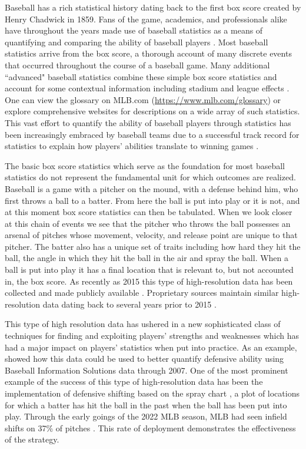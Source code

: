 \documentclass[12pt]{article}
\begin{document}
Baseball has a rich statistical history dating back to the first box score created by Henry Chadwick in 1859. Fans of the game, academics, and professionals alike have throughout the years made use of baseball statistics as a means of quantifying and comparing the ability of baseball players \citep{berry1999bridging, schwarz2004numbers, albert2006pitching, brown2008season, jensen2009hierarchical, jensen2009bayesball, piette2012estimating, baumer2015openwar, marchi2019analyzing}. Most baseball statistics arrive from the box score, a thorough account of many discrete events that occurred throughout the course of a baseball game. Many additional ``advanced" baseball statistics combine these simple box score statistics and account for some contextual information including stadium and league effects \citep{marchi2019analyzing}. One can view the glossary on MLB.com (\url{https://www.mlb.com/glossary}) or explore comprehensive websites \citep{bref, fangraphs, bp} for descriptions on a wide array of such statistics. This vast effort to quantify the ability of baseball players through statistics has been increasingly embraced by baseball teams due to a successful track record for statistics to explain how players' abilities translate to winning games \citep{lewis2004moneyball}.

The basic box score statistics which serve as the foundation for most baseball statistics do not represent the fundamental unit for which outcomes are realized. Baseball is a game with a pitcher on the mound, with a defense behind him, who first throws a ball to a batter. From here the ball is put into play or it is not, and at this moment box score statistics can then be tabulated. When we look closer at this chain of events we see that the pitcher who throws the ball possesses an arsenal of pitches whose movement, velocity, and release point are unique to that pitcher. The batter also has a unique set of traits including how hard they hit the ball, the angle in which they hit the ball in the air and spray the ball. When a ball is put into play it has a final location that is relevant to, but not accounted in, the box score. As recently as 2015 this type of high-resolution data has been collected and made publicly available \citep{statcast}. Proprietary sources maintain similar high-resolution data dating back to several years prior to 2015 \citep{BIS}.

This type of high resolution data has ushered in a new sophisticated class of techniques for finding and exploiting players' strengths and weaknesses which has had a major impact on players' statistics when put into practice. As an example, \cite{jensen2009bayesball} showed how this data could be used to better quantify defensive ability using Baseball Information Solutions data through 2007. One of the most prominent example of the success of this type of high-resolution data has been the implementation of defensive shifting based on the spray chart \citep{pettispray, marchi2019analyzing}, a plot of locations for which a batter has hit the ball in the past when the ball has been put into play. Through the early goings of the 2022 MLB season, MLB had seen infield shifts on 37\% of pitches \citep{baccellieri2022infield}. This rate of deployment demonstrates the effectiveness of the strategy.
\end{document}
